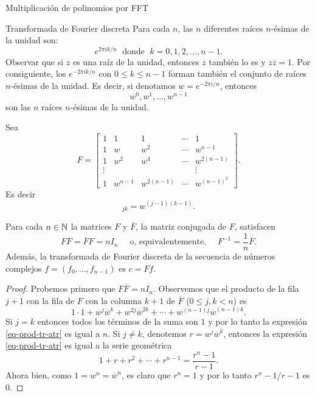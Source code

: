 \begin{chapter}{Multiplicación de polinomios por FFT}
\begin{section}{Transformada de Fourier discreta}
  Para cada $n$, las $n$ diferentes raíces $n$-ésimas de la unidad son:
  $$
      e^{2 \pi i k/n} \;\text{ donde }\;  k = 0, 1, 2, \ldots, n-1.
  $$
  Observar que si $z$ es una raíz de la unidad, entonces $\overline{z}$ también lo es y $z\overline{z} =1$.  Por consiguiente, los $e^{-2 \pi i k/n}$ con $0 \le k \le n-1$ forman también el conjunto de raíces $n$-ésimas de la unidad. Es decir, si denotamos $w = e^{-2 \pi i/n}$, entonces
  $$
      w^0, w^1,\ldots,w^{n-1}
  $$ son las $n$ raíces $n$-ésimas de la unidad.

  Sea
  \begin{equation*}
      F = \begin{bmatrix}
          1 & 1       & 1          & \cdots & 1           \\
          1 & w       & w^2        & \cdots & w^{n-1}     \\
          1 & w^2     & w^4        & \cdots & w^{2(n-1)}
          \\ \vdots & &  &  &\vdots \\
          1 & w^{n-1} & w^{2(n-1)} & \cdots & w^{(n-1)^2}
      \end{bmatrix}.
  \end{equation*}
  Es decir
  \begin{equation*}
      [F]_{jk} = w^{(j-1)(k-1)}.
  \end{equation*}


  \begin{teorema}
      Para cada $n \in \mathbb N$ la matrices $F$ y $\overline{F}$, la matriz conjugada de $F$,   satisfacen
      \begin{equation*}
          F \overline{F} = \overline{F}F = nI_n\quad\text{ o,  equivalentemente, }\quad F^{-1} = \frac{1}{n}  \overline{F}.
      \end{equation*}
      Además, la transformada de Fourier discreta de la secuencia de números complejos $f = (f_0,\ldots,f_{n-1})$ es $c = {F}f$.
  \end{teorema}
  \begin{proof}
      Probemos primero que $F \overline{F} = nI_n$. Observemos que el producto de la fila $j + 1 $ con la fila de $F$ con la columna $k +  1$ de $\overline{F}$  ($0 \le j, k < n$) es
      \begin{equation}\label{eq-prod-tr-atr}
          1\cdot1 + w^j\overline{w}^k + w^{2j}\overline{w}^{2k} + \cdots +  w^{(n-1)j}\overline{w}^{(n-1)k}.
      \end{equation}
      Si $j=k$  entonces todos los términos de la suma son $1$ y por lo tanto  la expresión \ref{eq-prod-tr-atr} es igual a $n$. Si $j \not= k$,
      denotemos $r =  w^j\overline{w}^k$,  entonces la expresión \ref{eq-prod-tr-atr} es igual a la serie geométrica
      \begin{equation*}
          1 +  r + r^2+ \cdots +r^{n-1} = \frac{r^n -1}{r -1}.
      \end{equation*}
      Ahora bien, como $1 = w^n = \overline{w}^n$, es claro que $r^n = 1$ y  por lo tanto $r^n -1/r -1$ es $0$.


\end{proof}
\end{section}
\end{chapter}
